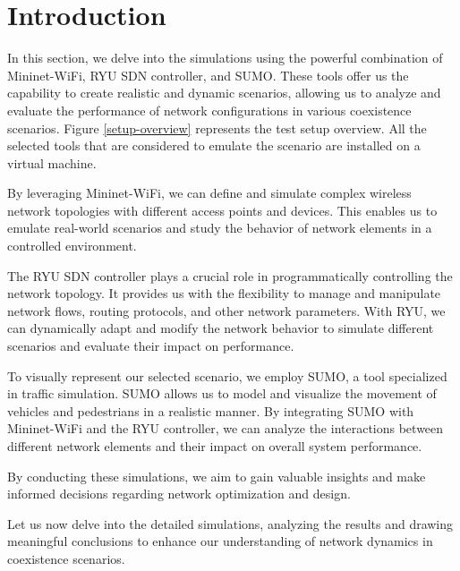 \documentclass[
  oneside,
  11pt, a4paper,
  footinclude=true,
  headinclude=true,
  cleardoublepage=empty
]{scrbook}
\begin{document}
\section{Introduction}

In this section, we delve into the simulations using the powerful combination of Mininet-WiFi, RYU SDN controller, and SUMO. These tools offer us the capability to create realistic and dynamic scenarios, allowing us to analyze and evaluate the performance of network configurations in various coexistence scenarios. Figure \ref{setup-overview} represents the test setup overview. All the selected tools that are considered to emulate the  scenario are installed on a virtual machine.

By leveraging Mininet-WiFi, we can define and simulate complex wireless network topologies with different access points and devices. This enables us to emulate real-world scenarios and study the behavior of network elements in a controlled environment.

The RYU SDN controller plays a crucial role in programmatically controlling the network topology. It provides us with the flexibility to manage and manipulate network flows, routing protocols, and other network parameters. With RYU, we can dynamically adapt and modify the network behavior to simulate different scenarios and evaluate their impact on performance.

To visually represent our selected scenario, we employ SUMO, a tool specialized in traffic simulation. SUMO allows us to model and visualize the movement of vehicles and pedestrians in a realistic manner. By integrating SUMO with Mininet-WiFi and the RYU controller, we can analyze the interactions between different network elements and their impact on overall system performance.

By conducting these simulations, we aim to gain valuable insights and make informed decisions regarding network optimization and design.

Let us now delve into the detailed simulations, analyzing the results and drawing meaningful conclusions to enhance our understanding of network dynamics in coexistence scenarios.
\end{document}
